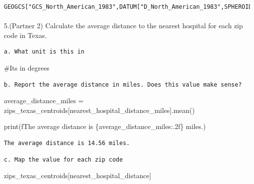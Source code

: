 \documentclass[
  letterpaper,
  DIV=11,
  numbers=noendperiod]{scrartcl}
\makeatletter
\let\oldparagraph\paragraph
\renewcommand{\paragraph}{
    \@ifstar
      \xxxParagraphStar
      \xxxParagraphNoStar
  }
\newcommand{\xxxParagraphStar}[1]{\oldparagraph*{#1}\mbox{}}
\newcommand{\xxxParagraphNoStar}[1]{\oldparagraph{#1}\mbox{}}
\newenvironment{Shaded}{\begin{snugshade}}{\end{snugshade}}
\newcommand{\BuiltInTok}[1]{\textcolor[rgb]{0.00,0.23,0.31}{#1}}
\newcommand{\CommentTok}[1]{\textcolor[rgb]{0.37,0.37,0.37}{#1}}
\newcommand{\NormalTok}[1]{\textcolor[rgb]{0.00,0.23,0.31}{#1}}
\newcommand{\OperatorTok}[1]{\textcolor[rgb]{0.37,0.37,0.37}{#1}}
\newcommand{\SpecialCharTok}[1]{\textcolor[rgb]{0.37,0.37,0.37}{#1}}
\newcommand{\SpecialStringTok}[1]{\textcolor[rgb]{0.13,0.47,0.30}{#1}}
\newcommand{\StringTok}[1]{\textcolor[rgb]{0.13,0.47,0.30}{#1}}
\makeatother
\begin{document}
\begin{verbatim}
GEOGCS["GCS_North_American_1983",DATUM["D_North_American_1983",SPHEROID["GRS_1980",6378137,298.257222101]],PRIMEM["Greenwich",0],UNIT["Degree",0.017453292519943295]]
\end{verbatim}

\paragraph{5.(Partner 2) Calculate the average distance to the nearest
hospital for each zip code in
Texas.}\label{partner-2-calculate-the-average-distance-to-the-nearest-hospital-for-each-zip-code-in-texas.}

\begin{verbatim}
a. What unit is this in
\end{verbatim}

\begin{Shaded}
\begin{Highlighting}[]
\CommentTok{\#Its in degrees}
\end{Highlighting}
\end{Shaded}

\begin{verbatim}
b. Report the average distance in miles. Does this value make sense?
\end{verbatim}

\begin{Shaded}
\begin{Highlighting}[]
\NormalTok{average\_distance\_miles }\OperatorTok{=}\NormalTok{ zips\_texas\_centroids[}\StringTok{\textquotesingle{}nearest\_hospital\_distance\_miles\textquotesingle{}}\NormalTok{].mean()}

\BuiltInTok{print}\NormalTok{(}\SpecialStringTok{f\textquotesingle{}The average distance is }\SpecialCharTok{\{}\NormalTok{average\_distance\_miles}\SpecialCharTok{:.2f\}}\SpecialStringTok{ miles.\textquotesingle{}}\NormalTok{)}
\end{Highlighting}
\end{Shaded}

\begin{verbatim}
The average distance is 14.56 miles.
\end{verbatim}

\begin{verbatim}
c. Map the value for each zip code
\end{verbatim}

\begin{Shaded}
\begin{Highlighting}[]
\NormalTok{zips\_texas\_centroids[}\StringTok{\textquotesingle{}nearest\_hospital\_distance\textquotesingle{}}\NormalTok{]}
\end{Highlighting}
\end{Shaded}
\end{document}
